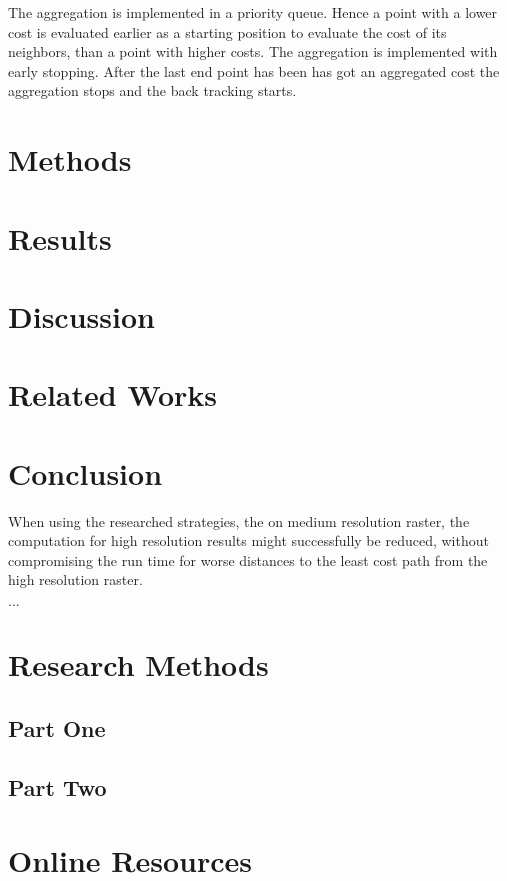 \documentclass[acmtog]{acmart}
\begin{document}
	The aggregation is implemented in a priority queue. 
	Hence a point with a lower cost is evaluated earlier as a starting position to evaluate the cost of its neighbors, than a point with higher costs.
	The aggregation is implemented with early stopping. 
	After the last end point has been has got an aggregated cost the aggregation stops and the back tracking starts.
	
	

	\section{Methods}\label{sec:methods}
	
	

	\section{Results}\label{sec:results}
	
	

	\section{Discussion}\label{sec:discussion}
	

	\section{Related Works}\label{sec:related-works}


	\section{Conclusion}\label{sec:conclusion}
	When using the researched strategies, the on medium resolution raster, the computation for high resolution results might successfully be reduced, without compromising the run time for worse distances to the least cost path from the high resolution raster.



\begin{acks}
	$\ldots$
\end{acks}





\appendix

\section{Research Methods}\label{sec:research-methods}

	\subsection{Part One}\label{subsec:part-one}

	\subsection{Part Two}\label{subsec:part-two}


	\section{Online Resources}\label{sec:online-resources}
\end{document}
